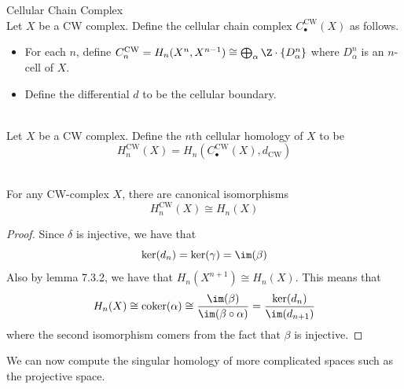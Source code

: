 \documentclass[a4paper]{article}
\begin{document}
\begin{defn}{Cellular Chain Complex}{}\\
Let $X$ be a CW complex. Define the cellular chain complex $C_\bullet^\text{CW}(X)$ as follows. 
\begin{itemize}
\item For each $n$, define $C_n^\text{CW}=H_n(X^n,X^{n-1})\cong\bigoplus_{\alpha}\Z\cdot\{D_\alpha^n\}$ where $D_\alpha^n$ is an $n$-cell of $X$. 
\item Define the differential $d$ to be the cellular boundary. 
\end{itemize}
\end{defn}

\begin{defn}{}{}\\
Let $X$ be a CW complex. Define the $n$th cellular homology of $X$ to be $$H_n^\text{CW}(X)=H_n(C_\bullet^\text{CW}(X),d_\text{CW})$$
\end{defn}

\begin{lmm}{}{}\\
For any CW-complex $X$, there are canonical isomorphisms $$H_n^\text{CW}(X)\cong H_n(X)$$ 
\begin{proof}
Since $\delta$ is injective, we have that $$\ker(d_n)=\ker(\gamma)=\im(\beta)$$ Also by lemma 7.3.2, we have that $H_n(X^{n+1})\cong H_n(X)$. This means that $$H_n(X)\cong\text{coker}(\alpha)\cong\frac{\im(\beta)}{\im(\beta\circ\alpha)}=\frac{\ker(d_n)}{\im(d_{n+1})}$$ where the second isomorphism comers from the fact that $\beta$ is injective. 
\end{proof}
\end{lmm}

We can now compute the singular homology of more complicated spaces such as the projective space. 
\end{document}
